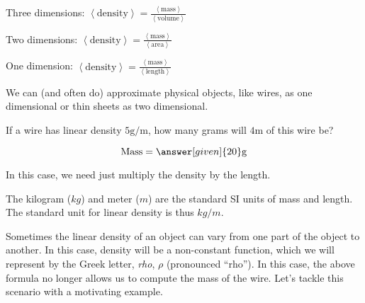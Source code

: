 \documentclass{ximera}
\begin{document}
Three dimensions: $\left<\textrm{density}\right> = \frac{\left<\textrm{mass}\right>}{\left<\textrm{volume}\right>}$

Two dimensions: $\left<\textrm{density}\right> = \frac{\left<\textrm{mass}\right>}{\left<\textrm{area}\right>}$

One dimension: $\left<\textrm{density}\right> = \frac{\left<\textrm{mass}\right>}{\left<\textrm{length}\right>}$

We can (and often do) approximate physical objects, like wires, as one dimensional or thin sheets as two dimensional. 

\begin{question}
  If a wire has linear density $5 \mathrm{g}/\mathrm{m}$, how many grams
  will $4 \mathrm{m}$ of this wire be?
  \begin{prompt}
  \[
  \mathrm{Mass} = \answer[given]{20} \mathrm{g}
  \]
  \end{prompt}
  \begin{hint}
    In this case, we need just multiply the density by the length.
  \end{hint}
\end{question}

\begin{fact}
The kilogram ($kg$) and meter ($m$) are the standard SI units of mass and length.  The standard unit for linear density is thus $kg/m$.
\end{fact}

Sometimes the linear density of an object can vary from one part of
the object to another. In this case, density will be a non-constant function, which we will represent by the Greek letter, \textit{rho}, $\rho$ (pronounced ``rho'').  In this case, the above formula no longer allows us to compute the mass of the wire.  Let's tackle this scenario with a motivating example.
\end{document}
